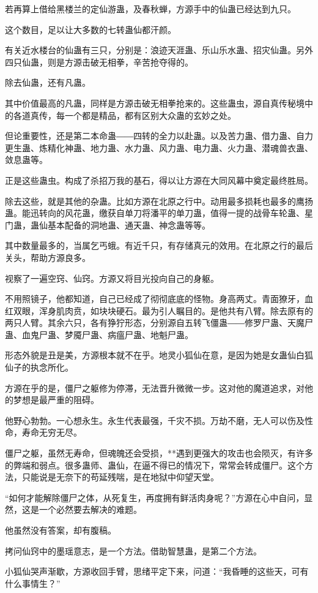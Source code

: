 \begin{this_body}
若再算上借给黑楼兰的定仙游蛊，及春秋蝉，方源手中的仙蛊已经达到九只。

这个数目，足以让大多数的七转蛊仙都汗颜。

有关近水楼台的仙蛊有三只，分别是：浪迹天涯蛊、乐山乐水蛊、招灾仙蛊。另外四只仙蛊，则是方源击破无相拳，辛苦抢夺得的。

除去仙蛊，还有凡蛊。

其中价值最高的凡蛊，同样是方源击破无相拳抢来的。这些蛊虫，源自真传秘境中的各道真传，每一个都是精品，都有区别大众蛊的玄妙之处。

但论重要性，还是第二本命蛊――四转的全力以赴蛊。以及苦力蛊、借力蛊、自力更生蛊、炼精化神蛊、地力蛊、水力蛊、风力蛊、电力蛊、火力蛊、潜魂兽衣蛊、敛息蛊等。

正是这些蛊虫。构成了杀招万我的基石，得以让方源在大同风幕中奠定最终胜局。

除去这些，就是其他的杂蛊。比如方源在北原之行中。动用最多损耗也最多的鹰扬蛊。能迅转向的风花蛊，缴获自单刀将潘平的单刀蛊，值得一提的战骨车轮蛊、星门蛊，蛊仙基本配备的洞地蛊、通天蛊、神念蛊等等。

其中数量最多的，当属乞丐蛾。有近千只，有存储真元的效用。在北原之行的最后关头，帮助方源良多。

视察了一遍空窍、仙窍。方源又将目光投向自己的身躯。

不用照镜子，他都知道，自己已经成了彻彻底底的怪物。身高两丈。青面獠牙，血红双眼，浑身肌肉贲，如块块硬石。最为引人瞩目的。是他共有八臂。除去原有的两只人臂。其余六只，各有狰狞形态，分别源自五转飞僵蛊――修罗尸蛊、天魔尸蛊、血鬼尸蛊、梦魇尸蛊、病瘟尸蛊、地魁尸蛊。

形态外貌是丑是美，方源根本就不在乎。地灵小狐仙在意，是因为她是女蛊仙白狐仙子的执念所化。

方源在乎的是，僵尸之躯修为停滞，无法晋升微微一步。这对他的魔道追求，对他的梦想是最严重的阻碍。

他野心勃勃。一心想永生。永生代表最强，千灾不损。万劫不磨，无人可以伤及性命，寿命无穷无尽。

僵尸之躯，虽然无寿命，但魂魄还会受损，**遇到更强大的攻击也会陨灭，有许多的弊端和弱点。很多蛊师、蛊仙，在逼不得已的情况下，常常会转成僵尸。这个方法，只能说是无奈下的苟延残喘，是在地狱中仰望天堂。

“如何才能解除僵尸之体，从死复生，再度拥有鲜活肉身呢？”方源在心中自问，显然，这是一个必然要去解决的难题。

他虽然没有答案，却有腹稿。

拷问仙窍中的墨瑶意志，是一个方法。借助智慧蛊，是第二个方法。

小狐仙哭声渐歇，方源收回手臂，思绪平定下来，问道：“我昏睡的这些天，可有什么事情生？”


\end{this_body}

